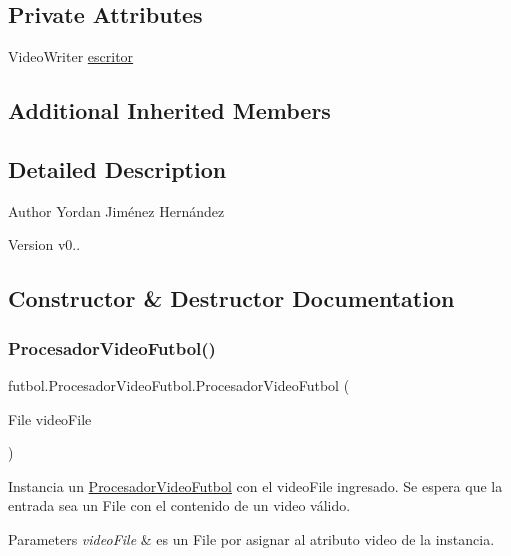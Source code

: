 \subsection*{Private Attributes}
\begin{DoxyCompactItemize}
\item 
Video\+Writer \hyperlink{classfutbol_1_1_procesador_video_futbol_a418840b4a45fbf94684ddb8f295cad70}{escritor}
\end{DoxyCompactItemize}
\subsection*{Additional Inherited Members}


\subsection{Detailed Description}
\begin{DoxyAuthor}{Author}
Yordan Jiménez Hernández 
\end{DoxyAuthor}
\begin{DoxyVersion}{Version}
v0.. 
\end{DoxyVersion}


\subsection{Constructor \& Destructor Documentation}
\hypertarget{classfutbol_1_1_procesador_video_futbol_a01fb8fa897352b416b90d4d42cd2ceeb}{}\label{classfutbol_1_1_procesador_video_futbol_a01fb8fa897352b416b90d4d42cd2ceeb} 
\subsubsection{\texorpdfstring{Procesador\+Video\+Futbol()}{ProcesadorVideoFutbol()}}
{\footnotesize\ttfamily futbol.\+Procesador\+Video\+Futbol.\+Procesador\+Video\+Futbol (\begin{DoxyParamCaption}\item[{File}]{video\+File }\end{DoxyParamCaption})}

Instancia un \hyperlink{classfutbol_1_1_procesador_video_futbol}{Procesador\+Video\+Futbol} con el video\+File ingresado. Se espera que la entrada sea un File con el contenido de un video válido. 
\begin{DoxyParams}{Parameters}
{\em video\+File} & es un File por asignar al atributo video de la instancia. \\
\hline
\end{DoxyParams}


